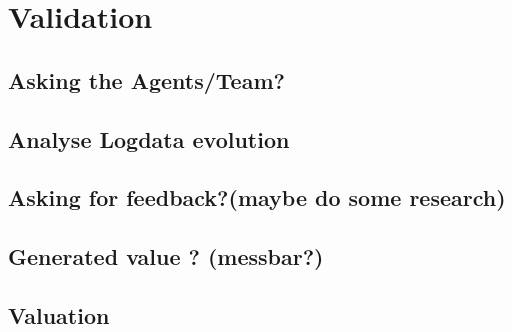 \chapter{Validation}
\section{Asking the Agents/Team?}
\section{Analyse Logdata evolution}
\section{Asking for feedback?(maybe do some research)}
\section{Generated value ? (messbar?)}
\section{Valuation}